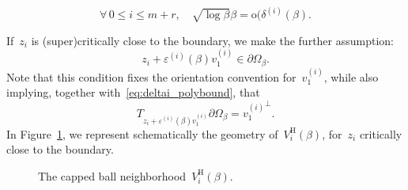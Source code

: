 \documentclass[10pt]{article}
\newcommand{\1}{\mathbbm 1}
\newcommand{\epsBoundary}[1]{\varepsilon^{(#1)}} %
\newcommand{\deltaRadius}[1]{\delta^{(#1)}} %
\newcommand{\localNeighborhood}[1]{V_{#1}^{\mathrm H}}
\newcommand{\hessEigvec}[2]{v^{(#1)}_{#2}} %
\begin{document}
    \begin{equation}
        \label{eq:scaling_deltai}
        \forall\,0\leq i\leq m+r,\quad\sqrt{\log \beta}{\beta} = \mathrm{o}(\deltaRadius{i}(\beta).
    \end{equation}
    
    If~$z_i$ is (super)critically close to the boundary, we make the further assumption:
    \begin{equation}
        \label{eq:def_varepsiloni}
        z_i + \epsBoundary{i}(\beta)\hessEigvec{i}{1} \in \partial\Omega_\beta.
    \end{equation}
    Note that this condition fixes the orientation convention for~$\hessEigvec{i}{1}$, while also implying, together with~\eqref{eq:deltai_polybound}, that 
    \begin{equation}
        \label{eq:tangent_condition}
        T_{z_i+\epsBoundary{i}(\beta)\hessEigvec{i}{1}}\partial\Omega_\beta = {\hessEigvec{i}{1}}^{\perp}.
    \end{equation}
    In Figure~\ref{fig:Vi_schematic}, we represent schematically the geometry of~$\localNeighborhood{i}(\beta)$, for~$z_i$ critically close to the boundary.

    \begin{figure}
        \label{fig:Vi_schematic}
    \center        
        \caption{The capped ball neighborhood~$\localNeighborhood{i}(\beta)$.}
    \end{figure}
\end{document}

